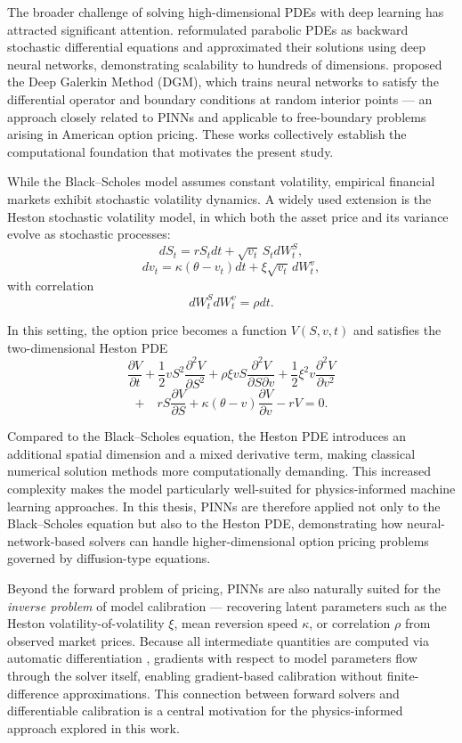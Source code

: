 The broader challenge of solving high-dimensional PDEs with deep learning has attracted significant attention. \textcite{han2018solving} reformulated parabolic PDEs as backward stochastic differential equations and approximated their solutions using deep neural networks, demonstrating scalability to hundreds of dimensions. \textcite{sirignano2018dgm} proposed the Deep Galerkin Method (DGM), which trains neural networks to satisfy the differential operator and boundary conditions at random interior points — an approach closely related to PINNs and applicable to free-boundary problems arising in American option pricing. These works collectively establish the computational foundation that motivates the present study.

While the Black--Scholes model assumes constant volatility, empirical financial markets exhibit stochastic volatility dynamics. A widely used extension is the Heston stochastic volatility model, in which both the asset price and its variance evolve as stochastic processes:
\[
dS_t = r S_t dt + \sqrt{v_t}\, S_t dW_t^S,
\]
\[
dv_t = \kappa(\theta - v_t)dt + \xi \sqrt{v_t}\, dW_t^v,
\]
with correlation
\[
dW_t^S dW_t^v = \rho dt.
\]

In this setting, the option price becomes a function $V(S,v,t)$ and satisfies the two-dimensional Heston PDE
\[
\frac{\partial V}{\partial t}
+
\frac{1}{2} v S^2 \frac{\partial^2 V}{\partial S^2}
+
\rho \xi v S \frac{\partial^2 V}{\partial S \partial v}
+
\frac{1}{2} \xi^2 v \frac{\partial^2 V}{\partial v^2}
\]
\[
+ \quad 
rS \frac{\partial V}{\partial S}
+
\kappa(\theta - v)\frac{\partial V}{\partial v}
-
rV
=
0.
\]

Compared to the Black--Scholes equation, the Heston PDE introduces an additional spatial dimension and a mixed derivative term, making classical numerical solution methods more computationally demanding. This increased complexity makes the model particularly well-suited for physics-informed machine learning approaches. In this thesis, PINNs are therefore applied not only to the Black--Scholes equation but also to the Heston PDE, demonstrating how neural-network-based solvers can handle higher-dimensional option pricing problems governed by diffusion-type equations.

Beyond the forward problem of pricing, PINNs are also naturally suited for the \emph{inverse problem} of model calibration — recovering latent parameters such as the Heston volatility-of-volatility $\xi$, mean reversion speed $\kappa$, or correlation $\rho$ from observed market prices. Because all intermediate quantities are computed via automatic differentiation \parencite{paszke2019pytorch}, gradients with respect to model parameters flow through the solver itself, enabling gradient-based calibration without finite-difference approximations. This connection between forward solvers and differentiable calibration is a central motivation for the physics-informed approach explored in this work.


